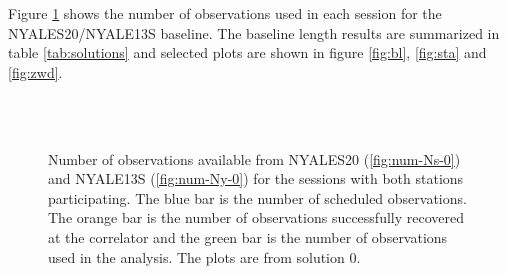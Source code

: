 \documentclass[natbib,twocolumn,twoside]{svmultiag}
\begin{document}
Figure \ref{fig:num_obs} shows the number of observations
used in each session for the NYALES20/NYALE13S baseline. The baseline length results are summarized in table 
\ref{tab:solutions} and selected plots are shown in figure \ref{fig:bl}, \ref{fig:sta} and \ref{fig:zwd}.  


\begin{figure}
	 \\
	 \\
    \caption{Number of observations available from NYALES20 (\ref{fig:num-Ns-0}) and NYALE13S (\ref{fig:num-Ny-0}) 
    for the sessions with both stations participating.
    The blue bar is the number of scheduled observations. The orange bar is the number of observations successfully 
    recovered at the correlator and the green bar is the number of observations used in the analysis. The plots are from 
    solution 0.}
	\label{fig:num_obs}
\end{figure}
\end{document}
